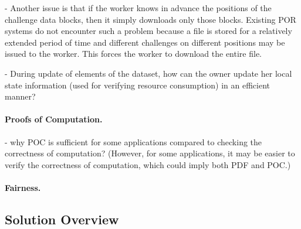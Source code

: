 - Another issue is that if the worker knows in advance the positions of the challenge data blocks, then it simply downloads only those blocks. Existing POR systems do not encounter such a problem because a file is stored for a relatively extended period of time and different challenges on different positions may be issued to the worker. This forces the worker to download the entire file.

- During update of elements of the dataset, how can the owner update her local state information (used for verifying resource consumption) in an efficient manner?

\paragraph{Proofs of Computation.}
- why POC is sufficient for some applications compared to checking the correctness of computation? (However, for some applications, it may be easier to verify the correctness of computation, which could imply both PDF and POC.)

\paragraph{Fairness.}



\subsection{Solution Overview} \label{sect:solution}

